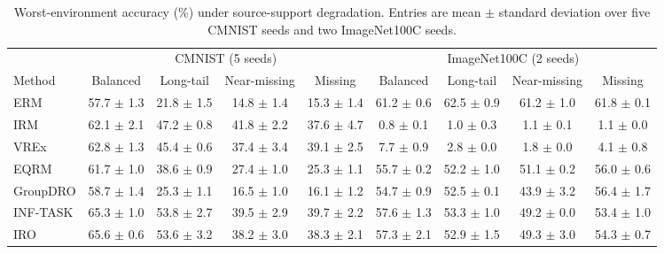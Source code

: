 \begin{table}[t]
\centering
\small
\caption{Worst-environment accuracy (\%) under source-support degradation. Entries are mean $\pm$ standard deviation over five CMNIST seeds and two ImageNet100C seeds.}
\label{tab:support-performance}
\begin{tabular}{@{}lcccccccc@{}}
\toprule
& \multicolumn{4}{c}{CMNIST (5 seeds)} & \multicolumn{4}{c}{ImageNet100C (2 seeds)} \\
\cmidrule(lr){2-5}\cmidrule(l){6-9}
Method & Balanced & Long-tail & Near-missing & Missing & Balanced & Long-tail & Near-missing & Missing \\
\midrule
ERM & 57.7 $\pm$ 1.3 & 21.8 $\pm$ 1.5 & 14.8 $\pm$ 1.4 & 15.3 $\pm$ 1.4 & 61.2 $\pm$ 0.6 & 62.5 $\pm$ 0.9 & 61.2 $\pm$ 1.0 & 61.8 $\pm$ 0.1 \\
IRM & 62.1 $\pm$ 2.1 & 47.2 $\pm$ 0.8 & 41.8 $\pm$ 2.2 & 37.6 $\pm$ 4.7 & 0.8 $\pm$ 0.1 & 1.0 $\pm$ 0.3 & 1.1 $\pm$ 0.1 & 1.1 $\pm$ 0.0 \\
VREx & 62.8 $\pm$ 1.3 & 45.4 $\pm$ 0.6 & 37.4 $\pm$ 3.4 & 39.1 $\pm$ 2.5 & 7.7 $\pm$ 0.9 & 2.8 $\pm$ 0.0 & 1.8 $\pm$ 0.0 & 4.1 $\pm$ 0.8 \\
EQRM & 61.7 $\pm$ 1.0 & 38.6 $\pm$ 0.9 & 27.4 $\pm$ 1.0 & 25.3 $\pm$ 1.1 & 55.7 $\pm$ 0.2 & 52.2 $\pm$ 1.0 & 51.1 $\pm$ 0.2 & 56.0 $\pm$ 0.6 \\
GroupDRO & 58.7 $\pm$ 1.4 & 25.3 $\pm$ 1.1 & 16.5 $\pm$ 1.0 & 16.1 $\pm$ 1.2 & 54.7 $\pm$ 0.9 & 52.5 $\pm$ 0.1 & 43.9 $\pm$ 3.2 & 56.4 $\pm$ 1.7 \\
INF-TASK & 65.3 $\pm$ 1.0 & 53.8 $\pm$ 2.7 & 39.5 $\pm$ 2.9 & 39.7 $\pm$ 2.2 & 57.6 $\pm$ 1.3 & 53.3 $\pm$ 1.0 & 49.2 $\pm$ 0.0 & 53.4 $\pm$ 1.0 \\
IRO & 65.6 $\pm$ 0.6 & 53.6 $\pm$ 3.2 & 38.2 $\pm$ 3.0 & 38.3 $\pm$ 2.1 & 57.3 $\pm$ 2.1 & 52.9 $\pm$ 1.5 & 49.3 $\pm$ 3.0 & 54.3 $\pm$ 0.7 \\
\bottomrule
\end{tabular}
\end{table}
